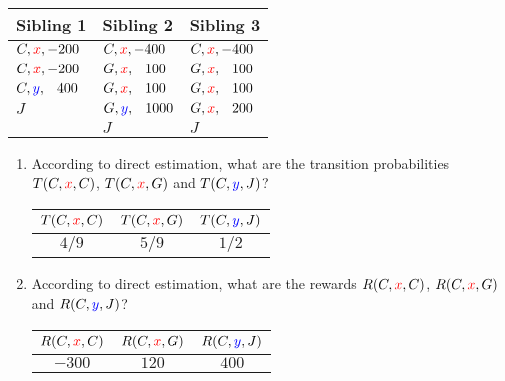\documentclass[12pt]{article}
\begin{document}
\begin{enumerate}
\begin{center}
\begin{tabular}{|l|l|l|} \hline
{\bf Sibling 1} & {\bf Sibling 2} & {\bf Sibling 3} \\ \hline
$C, {\color{red}{x}}, -200$ & $C, {\color{red}{x}}, -400$ & $C, {\color{red}{x}}, -400$ \\
$C, {\color{red}{x}}, -200$ & $G, {\color{red}{x}},  \phantom{-}100$ & $G, {\color{red}{x}},  \phantom{-}100$ \\
$C, {\color{blue}{y}}, \phantom{-}400$ & $G, {\color{red}{x}},  \phantom{-}100$ & $G, {\color{red}{x}},  \phantom{-}100$ \\
$J$          & $G, {\color{blue}{y}}, \phantom{-}1000$ & $G, {\color{red}{x}},  \phantom{-}200$ \\
             & $J$          & $J$          \\ \hline
\end{tabular}
\end{center}

  \begin{enumerate}

  \item According to direct estimation, what are the transition
    probabilities $T(C,{\color{red}{x}},C)$, $T(C,{\color{red}{x}},G)$ and $T(C,{\color{blue}{y}},J)$?

    \begin{table}[H]
      \centering
      \begin{tabular}{c c c}
        \hline\hline
        $T(C,{\color{red}{x}},C)$ & $T(C,{\color{red}{x}},G)$ & $T(C,{\color{blue}{y}},J)$\\
        \hline
        $4/9$ & $5/9$ & $1/2$\\
        \hline
       \end{tabular}
      \end{table}

  \item According to direct estimation, what are the rewards
    $R(C,{\color{red}{x}},C)$, $R(C,{\color{red}{x}},G)$ and $R(C,{\color{blue}{y}},J)$?


    \begin{table}[H]
      \centering
      \begin{tabular}{c c c}
        \hline\hline
        $R(C,{\color{red}{x}},C)$ & $R(C,{\color{red}{x}},G)$ & $R(C,{\color{blue}{y}},J)$\\
        \hline
        $-300$ & $120$ & $400$\\
        \hline
       \end{tabular}
      \end{table}



\end{enumerate}
\end{enumerate}
\end{document}
